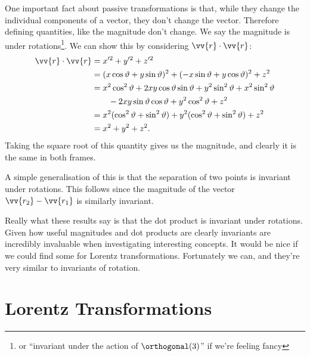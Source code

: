 \documentclass[fleqn]{NotesClass}
\begin{document}
    One important fact about passive transformations is that, while they change the individual components of a vector, they don't change the vector.
    Therefore defining quantities, like the magnitude don't change.
    We say the magnitude is  under rotations\footnote{or \enquote{invariant under the action of \(\orthogonal(3)\)} if we're feeling fancy}.
    We can show this by considering \(\vv{r} \cdot \vv{r}\):
    \begin{align}
        \vv{r} \cdot \vv{r} &= x'^2 + y'^2 + z'^2\\
        &= (x\cos\vartheta + y\sin\vartheta)^2 + (-x\sin\vartheta + y\cos\vartheta)^2 + z^2\\
        &= x^2\cos^2\vartheta + 2xy\cos\vartheta\sin\vartheta + y^2\sin^2\vartheta + x^2\sin^2\vartheta \\
        &\qquad- 2xy\sin\vartheta\cos\vartheta + y^2\cos^2\vartheta + z^2\\
        &= x^2(\cos^2\vartheta + \sin^2\vartheta) + y^2(\cos^2\vartheta + \sin^2\vartheta) + z^2\\
        &= x^2 + y^2 + z^2.
    \end{align}
    Taking the square root of this quantity gives us the magnitude, and clearly it is the same in both frames.
    
    A simple generalisation of this is that the separation of two points is invariant under rotations.
    This follows since the magnitude of the vector \(\vv{r_2} - \vv{r_1}\) is similarly invariant.
    
    Really what these results say is that the dot product is invariant under rotations.
    Given how useful magnitudes and dot products are clearly invariants are incredibly invaluable when investigating interesting concepts.
    It would be nice if we could find some for Lorentz transformations.
    Fortunately we can, and they're very similar to invariants of rotation.
    
    \section{Lorentz Transformations}
\end{document}

